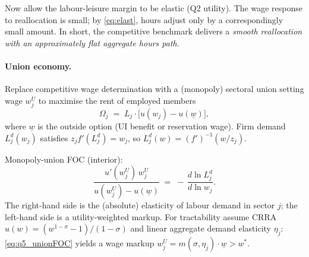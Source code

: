 \documentclass[11pt,a4paper]{article}
\begin{document}
Now allow the labour-leisure margin to be elastic (Q2 utility). The wage response to reallocation is small; by \eqref{eq:elast}, hours adjust only by a correspondingly small amount. In short, the competitive benchmark delivers a \emph{smooth reallocation with an approximately flat aggregate hours path}.

\paragraph{Union economy.}
Replace competitive wage determination with a (monopoly) sectoral union setting wage $w_j^{U}$ to maximise the rent of employed members
\[
\Omega_j\;=\;L_j\cdot\bigl[u(w_j)-u(\underline w)\bigr],
\]
where $\underline w$ is the outside option (UI benefit or reservation wage). Firm demand $L_j^{d}(w_j)$ satisfies $z_j f'(L_j^{d})=w_j$, so $L_j^{d}(w)=(f')^{-1}(w/z_j)$.

Monopoly-union FOC (interior):
\begin{equation}
\frac{u'(w_j^{U})\,w_j^{U}}{u(w_j^{U})-u(\underline w)}\;=\;-\,\frac{d\ln L_j^{d}}{d\ln w_j}.
\label{eq:q5_unionFOC}
\end{equation}
The right-hand side is the (absolute) elasticity of labour demand in sector $j$; the left-hand side is a utility-weighted markup. For tractability assume CRRA $u(w)=(w^{1-\sigma}-1)/(1-\sigma)$ and linear aggregate demand elasticity $\eta_j$: \eqref{eq:q5_unionFOC} yields a wage markup $w_j^{U}=m(\sigma,\eta_j)\cdot\underline w>w^{*}$.
\end{document}
